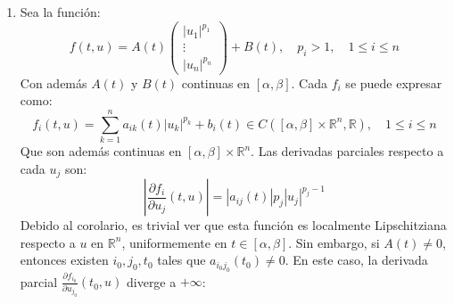 {\begin{enumerate}
\[\begin{pmatrix}
                \sin(u_1) \\
                \vdots \\
                \sin(u_n)
            \end{pmatrix}
            + B(t) 
        \]
        Donde $A(t)$ y $B(t)$ son continuas en $[\alpha, \beta]$. Cada $f_i$ se puede expresar como:
        \[
            f_i(t,u) = 
            \sum_{k=1}^n a_{ik}(t) \sin(u_k) + b_i(t), \quad 1 \leq i \leq n
        \]
        Que son además continuas en $[\alpha, \beta] \times \mathbb{R}^n$. Las derivadas parciales respecto a cada $u_j$ son:
        \[
            \left| \frac{\partial f_i}{\partial u_j}(t,u) \right| = 
            |a_{ij}(t)| |\cos(u_j)| \leq 
            |a_{ij}(t)| \leq 
            \max_{t \in [\alpha, \beta]} |a_{ij}(t)| = 
            \| a_{ij} \|_\infty < +\infty
        \]
        Por lo tanto, todas las derivadas parciales están uniformemente acotadas en $[\alpha, \beta] \times \mathbb{R}^n$, y la función $f$ es globalmente Lipschitziana respecto a $u \in \mathbb{R}^n$, uniformemente en $t \in [\alpha, \beta]$.\\
        Si las matrices $A(t)$ y $B(t)$ son continuas en todo $\mathbb{R}$, la función $f$ localmente Lipschitziana respecto a $u$ en $\mathbb{R}^n$, uniformemente en $t \in \mathbb{R}$, ya que en cualquier intervalo compacto de tiempo $[\alpha, \beta]$ se cumple la condición de Lipschitzianidad global, pero puede que no se cumpla la acotación global en todo $\mathbb{R}$.
        \item Sea la función:
        \[
            f(t,u) = A(t)
            \begin{pmatrix}
                |u_1|^{p_1} \\
                \vdots \\
                |u_n|^{p_n}
            \end{pmatrix}
            + B(t), \quad p_i > 1, \quad 1 \leq i \leq n
        \]
        Con además $A(t)$ y $B(t)$ continuas en $[\alpha, \beta]$. Cada $f_i$ se puede expresar como:
        \[
            f_i(t,u) = 
            \sum_{k=1}^n a_{ik}(t) |u_k|^{p_k} + b_i(t) \in C([\alpha, \beta] \times \mathbb{R}^n, \mathbb{R})
            , \quad 1 \leq i \leq n
        \]
        Que son además continuas en $[\alpha, \beta] \times \mathbb{R}^n$. Las derivadas parciales respecto a cada $u_j$ son:
        \[
            \left| \frac{\partial f_i}{\partial u_j}(t,u) \right| = 
            |a_{ij}(t)| p_j |u_j|^{p_j - 1}
        \]
        Debido al corolario, es trivial ver que esta función es localmente Lipschitziana respecto a $u$ en $\mathbb{R}^n$, uniformemente en $t \in [\alpha, \beta]$. Sin embargo, si $A(t) \neq 0$, entonces existen $i_0, j_0, t_0$ tales que $a_{i_0 j_0}(t_0) \neq 0$. En este caso, la derivada parcial $\frac{\partial f_{i_0}}{\partial u_{j_0}}(t_0,u)$ diverge a $+\infty$:

\end{enumerate}}
